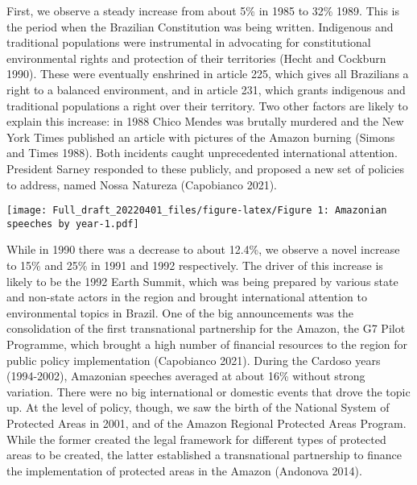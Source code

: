 \documentclass[
]{article}
\begin{document}
First, we observe a steady increase from about 5\% in 1985 to 32\% 1989.
This is the period when the Brazilian Constitution was being written.
Indigenous and traditional populations were instrumental in advocating
for constitutional environmental rights and protection of their
territories (Hecht and Cockburn 1990). These were eventually enshrined
in article 225, which gives all Brazilians a right to a balanced
environment, and in article 231, which grants indigenous and traditional
populations a right over their territory. Two other factors are likely
to explain this increase: in 1988 Chico Mendes was brutally murdered and
the New York Times published an article with pictures of the Amazon
burning (Simons and Times 1988). Both incidents caught unprecedented
international attention. President Sarney responded to these publicly,
and proposed a new set of policies to address, named Nossa Natureza
(Capobianco 2021).

\texttt{[image: Full\_draft\_20220401\_files/figure-latex/Figure 1: Amazonian speeches by year-1.pdf]}

While in 1990 there was a decrease to about 12.4\%, we observe a novel
increase to 15\% and 25\% in 1991 and 1992 respectively. The driver of
this increase is likely to be the 1992 Earth Summit, which was being
prepared by various state and non-state actors in the region and brought
international attention to environmental topics in Brazil. One of the
big announcements was the consolidation of the first transnational
partnership for the Amazon, the G7 Pilot Programme, which brought a high
number of financial resources to the region for public policy
implementation (Capobianco 2021). During the Cardoso years (1994-2002),
Amazonian speeches averaged at about 16\% without strong variation.
There were no big international or domestic events that drove the topic
up. At the level of policy, though, we saw the birth of the National
System of Protected Areas in 2001, and of the Amazon Regional Protected
Areas Program. While the former created the legal framework for
different types of protected areas to be created, the latter established
a transnational partnership to finance the implementation of protected
areas in the Amazon (Andonova 2014).
\end{document}
